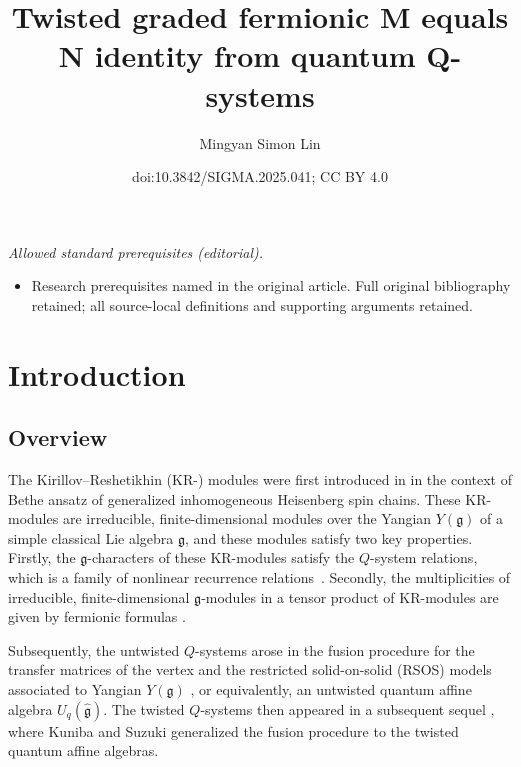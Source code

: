 \documentclass[10pt,a4paper]{amsart}
\title{Twisted graded fermionic M equals N identity from quantum Q-systems}
\author{Mingyan Simon Lin}
\date{doi:10.3842/SIGMA.2025.041; CC BY 4.0}
\numberwithin{equation}{section}
\begin{document}
\maketitle
\noindent\textit{Allowed standard prerequisites (editorial).}\begin{itemize}
\item Research prerequisites named in the original article. Full original bibliography retained; all source-local definitions and supporting arguments retained.
\end{itemize}\medskip
\section{Introduction}\label{Section 1}

\subsection{Overview}\label{Section 1.1}

The Kirillov--Reshetikhin (KR-) modules were first introduced in \cite{KR87} in the context of Bethe ansatz of generalized inhomogeneous Heisenberg spin chains. These KR-modules are irreducible, finite-dimensional modules over the Yangian $Y(\mathfrak{g})$ of a simple classical Lie algebra $\mathfrak{g}$, and these modules satisfy two key properties. Firstly, the $\mathfrak{g}$-characters of these KR-modules satisfy the $Q$-system relations, which is a family of nonlinear recurrence relations~\cite{Kirillov89,KR87}. Secondly, the multiplicities of irreducible, finite-dimensional $\mathfrak{g}$-modules in a tensor product of KR-modules are given by fermionic formulas \cite{KR87}.

Subsequently, the untwisted $Q$-systems arose in the fusion procedure for the transfer matrices of the vertex and the restricted solid-on-solid (RSOS) models associated to Yangian $Y(\mathfrak{g})$ \cite{KNS94}, or equivalently, an untwisted quantum affine algebra $U_q(\widehat{\mathfrak{g}})$. The twisted $Q$-systems then appeared in a subsequent sequel \cite{KS95}, where Kuniba and Suzuki generalized the fusion procedure to the twisted quantum affine algebras.
\end{document}
